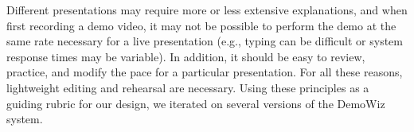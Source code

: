Different presentations may require more or less extensive explanations, and when first recording a demo video, it may not be possible to perform the demo at the same rate necessary for a live presentation (e.g., typing can be difficult or system response times may be variable). In addition, it should be easy to review, practice, and modify the pace for a particular presentation. For all these reasons, lightweight editing and rehearsal are necessary.  Using these principles as a guiding rubric for our design, we iterated on several versions of the DemoWiz system.

